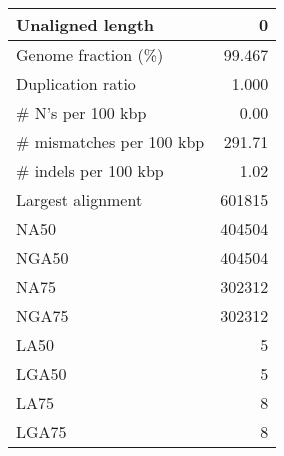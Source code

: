 \documentclass[12pt,a4paper]{article}
\begin{document}
\begin{table}[ht]
\begin{center}
\begin{tabular}{|l*{1}{|r}|}
Unaligned length & 0 \\ \hline
Genome fraction (\%) & 99.467 \\ \hline
Duplication ratio & 1.000 \\ \hline
\# N's per 100 kbp & 0.00 \\ \hline
\# mismatches per 100 kbp & 291.71 \\ \hline
\# indels per 100 kbp & 1.02 \\ \hline
Largest alignment & 601815 \\ \hline
NA50 & 404504 \\ \hline
NGA50 & 404504 \\ \hline
NA75 & 302312 \\ \hline
NGA75 & 302312 \\ \hline
LA50 & 5 \\ \hline
LGA50 & 5 \\ \hline
LA75 & 8 \\ \hline
LGA75 & 8 \\ \hline
\end{tabular}
\end{center}
\end{table}
\end{document}
